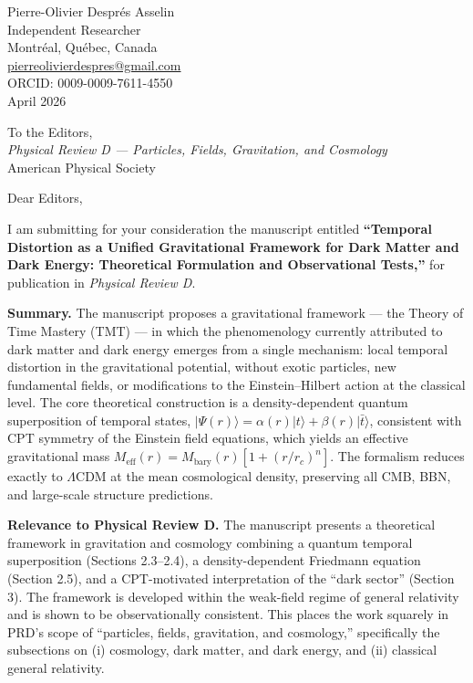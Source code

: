 \documentclass[12pt]{article}
\begin{document}
\begin{flushright}
  Pierre-Olivier Despr\'{e}s Asselin \\
  Independent Researcher \\
  Montr\'{e}al, Qu\'{e}bec, Canada \\
  \href{mailto:pierreolivierdespres@gmail.com}{pierreolivierdespres@gmail.com} \\
  ORCID: 0009-0009-7611-4550 \\[6pt]
  April 2026
\end{flushright}

\bigskip

\noindent
To the Editors, \\
\textit{Physical Review D --- Particles, Fields, Gravitation, and Cosmology} \\
American Physical Society

\bigskip

Dear Editors,

I am submitting for your consideration the manuscript entitled
\textbf{``Temporal Distortion as a Unified Gravitational Framework for
Dark Matter and Dark Energy: Theoretical Formulation and
Observational Tests,''} for publication in \textit{Physical Review D}.

\bigskip

\textbf{Summary.}
The manuscript proposes a gravitational framework --- the Theory of
Time Mastery (TMT) --- in which the phenomenology currently attributed
to dark matter and dark energy emerges from a single mechanism:
local temporal distortion in the gravitational potential, without
exotic particles, new fundamental fields, or modifications to the
Einstein--Hilbert action at the classical level. The core theoretical
construction is a density-dependent quantum superposition of temporal
states, $|\Psi(r)\rangle = \alpha(r)|t\rangle + \beta(r)|\bar t\rangle$,
consistent with CPT symmetry of the Einstein field equations, which
yields an effective gravitational mass
$M_\mathrm{eff}(r) = M_\mathrm{bary}(r)[1 + (r/r_c)^n]$. The formalism
reduces exactly to $\Lambda$CDM at the mean cosmological density,
preserving all CMB, BBN, and large-scale structure predictions.

\bigskip

\textbf{Relevance to Physical Review D.}
The manuscript presents a theoretical framework in gravitation and
cosmology combining a quantum temporal superposition
(Sections 2.3--2.4), a density-dependent Friedmann equation
(Section 2.5), and a CPT-motivated interpretation of the ``dark
sector'' (Section 3). The framework is developed within the weak-field
regime of general relativity and is shown to be observationally
consistent. This places the work squarely in PRD's scope of
``particles, fields, gravitation, and cosmology,'' specifically the
subsections on (i) cosmology, dark matter, and dark energy, and
(ii) classical general relativity.
\end{document}
